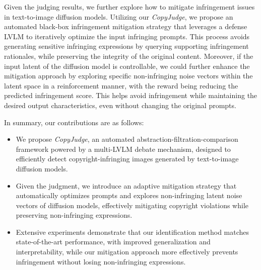 Given the judging results, we further explore how to mitigate infringement issues in text-to-image diffusion models. Utilizing our \textit{CopyJudge}, we propose an automated black-box infringement mitigation strategy that leverages a defense LVLM to iteratively optimize the input infringing prompts. This process avoids generating sensitive infringing expressions by querying supporting infringement rationales, while preserving the integrity of the original content. Moreover, if the input latent of the diffusion model is controllable, we could further enhance the mitigation approach by exploring specific non-infringing noise vectors within the latent space in a reinforcement manner, with the reward being reducing the predicted infringement score. This helps avoid infringement while maintaining the desired output characteristics, even without changing the original prompts. 


In summary, our contributions are as follows:
\begin{itemize}
\item We propose \textit{CopyJudge}, an automated abstraction-filtration-comparison framework powered by a multi-LVLM debate mechanism, designed to efficiently detect copyright-infringing images generated by text-to-image diffusion models. 
\item Given the judgment, we introduce an adaptive mitigation strategy that automatically optimizes prompts and explores non-infringing latent noise vectors of diffusion models, effectively mitigating copyright violations while preserving non-infringing expressions.
\item Extensive experiments demonstrate that our identification method matches state-of-the-art performance, with improved generalization and interpretability, while our mitigation approach more effectively prevents infringement without losing non-infringing expressions.
\end{itemize}
